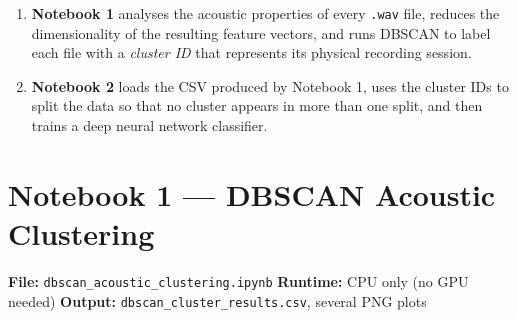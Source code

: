 \documentclass[12pt,a4paper]{article}
\begin{document}
\begin{center}
\end{center}

\vspace{6pt}
\begin{enumerate}
  \item \textbf{Notebook 1} analyses the acoustic properties of every \texttt{.wav} file, reduces the dimensionality of the resulting feature vectors, and runs DBSCAN to label each file with a \textit{cluster ID} that represents its physical recording session.
  \item \textbf{Notebook 2} loads the CSV produced by Notebook 1, uses the cluster IDs to split the data so that no cluster appears in more than one split, and then trains a deep neural network classifier.
\end{enumerate}


\section{Notebook 1 --- DBSCAN Acoustic Clustering}

\begin{notebookbox}
\textbf{File:} \texttt{dbscan\_acoustic\_clustering.ipynb} \quad
\textbf{Runtime:} CPU only (no GPU needed) \quad
\textbf{Output:} \texttt{dbscan\_cluster\_results.csv}, several PNG plots
\end{notebookbox}
\end{document}
